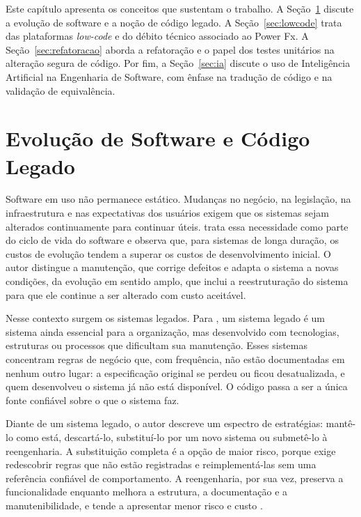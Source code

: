 Este capítulo apresenta os conceitos que sustentam o trabalho. A Seção~\ref{sec:evolucao} discute a evolução de software e a noção de código legado. A Seção~\ref{sec:lowcode} trata das plataformas \textit{low-code} e do débito técnico associado ao Power Fx. A Seção~\ref{sec:refatoracao} aborda a refatoração e o papel dos testes unitários na alteração segura de código. Por fim, a Seção~\ref{sec:ia} discute o uso de Inteligência Artificial na Engenharia de Software, com ênfase na tradução de código e na validação de equivalência.

\section{Evolução de Software e Código Legado}
\label{sec:evolucao}

Software em uso não permanece estático. Mudanças no negócio, na legislação, na infraestrutura e nas expectativas dos usuários exigem que os sistemas sejam alterados continuamente para continuar úteis.  trata essa necessidade como parte do ciclo de vida do software e observa que, para sistemas de longa duração, os custos de evolução tendem a superar os custos de desenvolvimento inicial. O autor distingue a manutenção, que corrige defeitos e adapta o sistema a novas condições, da evolução em sentido amplo, que inclui a reestruturação do sistema para que ele continue a ser alterado com custo aceitável.

Nesse contexto surgem os sistemas legados. Para , um sistema legado é um sistema ainda essencial para a organização, mas desenvolvido com tecnologias, estruturas ou processos que dificultam sua manutenção. Esses sistemas concentram regras de negócio que, com frequência, não estão documentadas em nenhum outro lugar: a especificação original se perdeu ou ficou desatualizada, e quem desenvolveu o sistema já não está disponível. O código passa a ser a única fonte confiável sobre o que o sistema faz.

Diante de um sistema legado, o autor descreve um espectro de estratégias: mantê-lo como está, descartá-lo, substituí-lo por um novo sistema ou submetê-lo à reengenharia. A substituição completa é a opção de maior risco, porque exige redescobrir regras que não estão registradas e reimplementá-las sem uma referência confiável de comportamento. A reengenharia, por sua vez, preserva a funcionalidade enquanto melhora a estrutura, a documentação e a manutenibilidade, e tende a apresentar menor risco e custo \cite{sommerville2011engenharia}.

